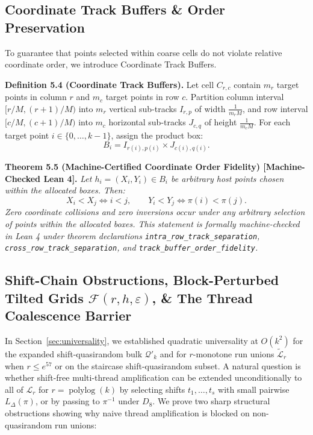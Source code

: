 \documentclass[
  11pt,
]{article}
\begin{document}
\subsection{Coordinate Track Buffers \& Order Preservation}\label{sec:track-buffers}

To guarantee that points selected within coarse cells do not violate relative coordinate order, we introduce Coordinate Track Buffers.

\textbf{Definition 5.4 (Coordinate Track Buffers).}
Let cell $C_{r, c}$ contain $m_r$ target points in column $r$ and $m_c$ target points in row $c$.
Partition column interval $[r/M, (r+1)/M)$ into $m_r$ vertical sub-tracks $I_{r, p}$ of width $\frac{1}{m_r M}$, and row interval $[c/M, (c+1)/M)$ into $m_c$ horizontal sub-tracks $J_{c, q}$ of height $\frac{1}{m_c M}$.
For each target point $i \in \{0, \dots, k-1\}$, assign the product box:
\begin{equation}
B_i = I_{r(i), p(i)} \times J_{c(i), q(i)}.
\end{equation}

\textbf{Theorem 5.5 (Machine-Certified Coordinate Order Fidelity) [Machine-Checked Lean 4].}
\emph{Let $h_i = (X_i, Y_i) \in B_i$ be arbitrary host points chosen within the allocated boxes. Then:}
\begin{equation}
X_i < X_j \iff i < j, \qquad Y_i < Y_j \iff \pi(i) < \pi(j).
\end{equation}
\emph{Zero coordinate collisions and zero inversions occur under any arbitrary selection of points within the allocated boxes. This statement is formally machine-checked in Lean 4 under theorem declarations \texttt{intra\_row\_track\_separation}, \texttt{cross\_row\_track\_separation}, and \texttt{track\_buffer\_order\_fidelity}.}

\subsection{\texorpdfstring{Shift-Chain Obstructions, Block-Perturbed Tilted Grids \(\mathcal{F}(r, h, \varepsilon)\), \& The Thread Coalescence Barrier}{Shift-Chain Obstructions, Block-Perturbed Tilted Grids \textbackslash mathcal\{F\}(r, h, \textbackslash varepsilon), \& The Thread Coalescence Barrier}}\label{sec:w18-coalescence}

In Section~\ref{sec:universality}, we established quadratic universality at \(O(k^2)\) for the expanded shift-quasirandom bulk \(\mathcal{Q}'_k\) and for \(r\)-monotone run unions \(\widetilde{\mathcal{L}}_r\) when \(r \le e^{57}\) or on the staircase shift-quasirandom subset. A natural question is whether shift-free multi-thread amplification can be extended unconditionally to all of \(\mathcal{L}_r\) for \(r = \operatorname{polylog}(k)\) by selecting shifts \(t_1, \dots, t_s\) with small pairwise \(L_\Delta(\pi)\), or by passing to \(\pi^{-1}\) under \(D_8\). We prove two sharp structural obstructions showing why naive thread amplification is blocked on non-quasirandom run unions:
\end{document}
